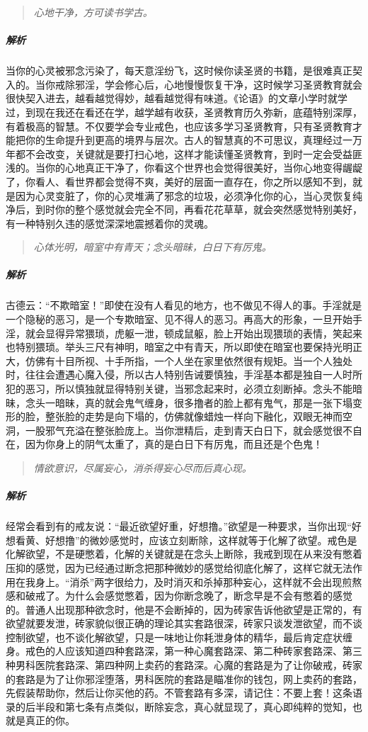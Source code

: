 \begin{quote}\it
    心地干净，方可读书学古。
\end{quote}

\subparagraph{解析} 当你的心灵被邪念污染了，每天意淫纷飞，这时候你读圣贤的书籍，是很难真正契入的。当你戒除邪淫，学会修心后，心地慢慢恢复干净，这时候学习圣贤教育就会很快契入进去，越看越觉得妙，越看越觉得有味道。《论语》的文章小学时就学过，到现在我还在看还在学，越学越有收获，圣贤教育历久弥新，底蕴特别深厚，有着极高的智慧。不仅要学会专业戒色，也应该多学习圣贤教育，只有圣贤教育才能把你的生命提升到更高的境界与层次。古人的智慧真的不可思议，真理经过一万年都不会改变，关键就是要打扫心地，这样才能读懂圣贤教育，到时一定会受益匪浅的。当你的心地真正干净了，你看这个世界也会觉得很美好，当你心地变得龌龊了，你看人、看世界都会觉得不爽，美好的层面一直存在，你之所以感知不到，就是因为心灵变脏了，你的心灵堆满了邪念的垃圾，必须净化你的心，当心灵恢复纯净后，到时你的整个感觉就会完全不同，再看花花草草，就会突然感觉特别美好，有一种特别久违的感觉深深地震撼着你的灵魂。

\begin{quote}\it
    心体光明，暗室中有青天；念头暗昧，白日下有厉鬼。
\end{quote}

\subparagraph{解析} 古德云：“不欺暗室！”即使在没有人看见的地方，也不做见不得人的事。手淫就是一个隐秘的恶习，是一个专欺暗室、见不得人的恶习。再高大的形象，一旦开始手淫，就会显得异常猥琐，虎躯一泄，顿成鼠躯，脸上开始出现猥琐的表情，笑起来也特别猥琐。举头三尺有神明，暗室之中有青天，所以即使在暗室也要保持光明正大，仿佛有十目所视、十手所指，一个人坐在家里依然很有规矩。当一个人独处时，往往会遭遇心魔入侵，所以古人特别告诫要慎独，手淫基本都是独自一人时所犯的恶习，所以慎独就显得特别关键，当邪念起来时，必须立刻断掉。念头不能暗昧，念头一暗昧，真的就会鬼气缠身，很多撸者的脸上都有鬼气，那是一张下塌变形的脸，整张脸的走势是向下塌的，仿佛就像蜡烛一样向下融化，双眼无神而空洞，一股邪气充溢在整张脸庞上。当你泄精后，走到青天白日下，就会感觉很不自在，因为你身上的阴气太重了，真的是白日下有厉鬼，而且还是个色鬼！

\begin{quote}\it
    情欲意识，尽属妄心，消杀得妄心尽而后真心现。
\end{quote}

\subparagraph{解析} 经常会看到有的戒友说：“最近欲望好重，好想撸。”欲望是一种要求，当你出现“好想看黄、好想撸”的微妙感觉时，应该立刻断除，这样就等于化解了欲望。戒色是化解欲望，不是硬憋着，化解的关键就是在念头上断除，我戒到现在从来没有憋着压抑的感觉，因为已经通过断念把那种微妙的感觉给彻底化解了，这样它就无法作用在我身上。“消杀”两字很给力，及时消灭和杀掉那种妄心，这样就不会出现煎熬感和破戒了。为什么会感觉憋着，因为你断念晚了，断念早是不会有憋着的感觉的。普通人出现那种欲念时，他是不会断掉的，因为砖家告诉他欲望是正常的，有欲望就要发泄，砖家貌似很正确的理论其实套路很深，砖家只谈发泄欲望，而不谈控制欲望，也不谈化解欲望，只是一味地让你耗泄身体的精华，最后肯定症状缠身。戒色的人应该知道四种套路深，第一种心魔套路深、第二种砖家套路深、第三种男科医院套路深、第四种网上卖药的套路深。心魔的套路是为了让你破戒，砖家的套路是为了让你邪淫堕落，男科医院的套路是瞄准你的钱包，网上卖药的套路，先假装帮助你，然后让你买他的药。不管套路有多深，请记住：不要上套！这条语录的后半段和第七条有点类似，断除妄念，真心就显现了，真心即纯粹的觉知，也就是真正的你。

